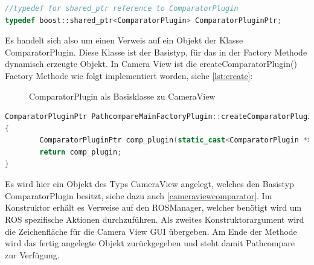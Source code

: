 \begin{lstlisting}[caption=ROS transformation message, language=C++, basicstyle=\footnotesize, label=lst:returntypedef]
//typedef for shared_ptr reference to ComparatorPlugin
typedef boost::shared_ptr<ComparatorPlugin> ComparatorPluginPtr;
\end{lstlisting}

Es handelt sich also um einen Verweis auf ein Objekt der Klasse
ComparatorPlugin. Diese Klasse ist der Basistyp, für das in der Factory Methode
dynamisch erzeugte Objekt. In Camera View ist die createComparatorPlugin()
Factory Methode wie folgt implementiert worden, siehe \autoref{lst:create}:

 \begin{figure}[t]
   \begin{center}
   \end{center}
   \caption{ComparatorPlugin als Basisklasse zu CameraView}
   \label{fig:cameraviewcomparator}
 \end{figure}

\begin{lstlisting}[caption=ROS transformation message, language=C++, basicstyle=\footnotesize, label=lst:create]
ComparatorPluginPtr PathcompareMainFactoryPlugin::createComparatorPlugin(ROSManager * ros_manager, QWidget *tab_widget) const
{
        ComparatorPluginPtr comp_plugin(static_cast<ComparatorPlugin *>(new CameraView(ros_manager, tab_widget)));
        return comp_plugin;
}
\end{lstlisting}

Es wird hier ein Objekt des Typs CameraView angelegt, welches den Basistyp
ComparatorPlugin besitzt, siehe dazu auch \autoref{cameraviewcomparator}. Im
Konstruktor erhält es Verweise auf den ROSManager, welcher benötigt wird um ROS
spezifische Aktionen durchzuführen. Als zweites Konstruktorargument wird die
Zeichenfläche für die Camera View GUI übergeben.  Am Ende der Methode wird das
fertig angelegte Objekt zurückgegeben und steht damit Pathcompare zur
Verfügung. 

